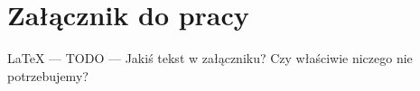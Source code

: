 
\chapter{Załącznik do pracy}


\LaTeX
--- TODO ---
Jakiś tekst w załączniku?
Czy właściwie niczego nie potrzebujemy?

